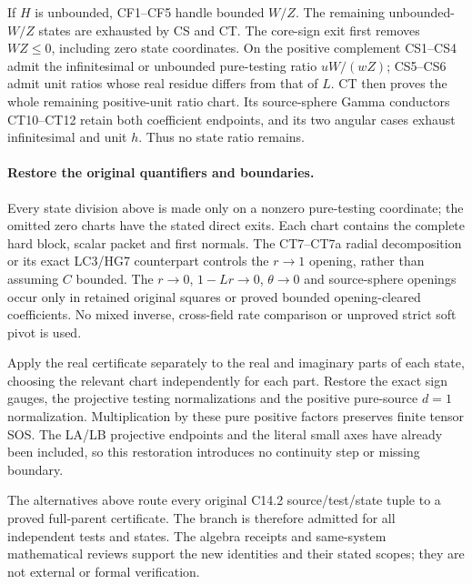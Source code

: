 If $H$ is unbounded, CF1--CF5 handle bounded $W/Z$.
The remaining unbounded-$W/Z$ states are exhausted by CS and CT.
The core-sign exit first removes $WZ\le0$, including zero state
coordinates.  On the positive complement CS1--CS4 admit the
infinitesimal or unbounded pure-testing ratio
$uW/(wZ)$; CS5--CS6 admit unit ratios whose real residue differs
from that of $L$.  CT then proves the whole remaining positive-unit
ratio chart.  Its source-sphere Gamma conductors CT10--CT12 retain
both coefficient endpoints, and its two angular cases exhaust
infinitesimal and unit $h$.  Thus no state ratio remains.

\paragraph{Restore the original quantifiers and boundaries.}
Every state division above is made only on a nonzero pure-testing
coordinate; the omitted zero charts have the stated direct exits.
Each chart contains the complete hard block, scalar packet and
first normals.  The CT7--CT7a radial decomposition or its exact
LC3/HG7 counterpart controls the $r\to1$ opening, rather than
assuming $C$ bounded.  The $r\to0$, $1-Lr\to0$, $\theta\to0$
and source-sphere openings occur only in retained original squares
or proved bounded opening-cleared coefficients.  No mixed inverse,
cross-field rate comparison or unproved strict soft pivot is used.

Apply the real certificate separately to the real and imaginary
parts of each state, choosing the relevant chart independently for
each part.  Restore the exact sign gauges, the projective testing
normalizations and the positive pure-source $d=1$ normalization.
Multiplication by these pure positive factors preserves finite
tensor SOS.  The LA/LB projective endpoints and the literal small
axes have already been included, so this restoration introduces
no continuity step or missing boundary.

The alternatives above route every original C14.2 source/test/state
tuple to a proved full-parent certificate.  The branch is therefore
admitted for all independent tests and states.  The algebra receipts
and same-system mathematical reviews support the new identities
and their stated scopes; they are not external or formal verification.
